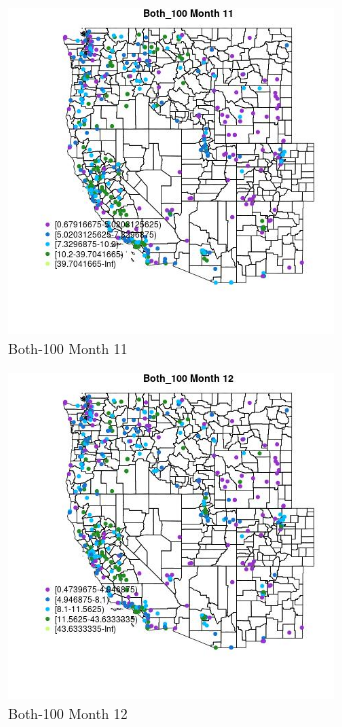 \begin{figure} 
\centering  
\includegraphics[width=0.77\textwidth]{Code_Outputs/ML_input_report_ML_input_PM25_Step5_part_d_de_duplicated_aves_ML_input_MapObsMo11Both_100.jpg} 
\caption{\label{fig:ML_input_report_ML_input_PM25_Step5_part_d_de_duplicated_aves_ML_inputMapObsMo11Both_100}Both-100 Month 11} 
\end{figure} 
 

\begin{figure} 
\centering  
\includegraphics[width=0.77\textwidth]{Code_Outputs/ML_input_report_ML_input_PM25_Step5_part_d_de_duplicated_aves_ML_input_MapObsMo12Both_100.jpg} 
\caption{\label{fig:ML_input_report_ML_input_PM25_Step5_part_d_de_duplicated_aves_ML_inputMapObsMo12Both_100}Both-100 Month 12} 
\end{figure} 
 

